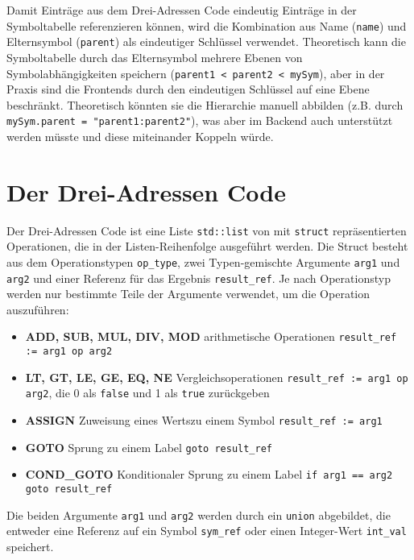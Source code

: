 Damit Einträge aus dem Drei-Adressen Code eindeutig Einträge in der Symboltabelle referenzieren können, wird die Kombination aus Name (\texttt{name}) und Elternsymbol (\texttt{parent}) als eindeutiger Schlüssel verwendet.
Theoretisch kann die Symboltabelle durch das Elternsymbol mehrere Ebenen von Symbolabhängigkeiten speichern (\texttt{parent1 < parent2 < mySym}), aber in der Praxis sind die Frontends durch den eindeutigen Schlüssel auf eine Ebene beschränkt.
Theoretisch könnten sie die Hierarchie manuell abbilden (z.B. durch \texttt{mySym.parent = "parent1:parent2"}), was aber im Backend auch unterstützt werden müsste und diese miteinander Koppeln würde.\\

\section{Der Drei-Adressen Code}

Der Drei-Adressen Code ist eine Liste \texttt{std::list} von mit \texttt{struct} repräsentierten Operationen, die in der Listen-Reihenfolge ausgeführt werden.
Die Struct besteht aus dem Operationstypen \texttt{op\_type}, zwei Typen-gemischte Argumente \texttt{arg1} und \texttt{arg2} und einer Referenz für das Ergebnis \texttt{result\_ref}.
Je nach Operationstyp werden nur bestimmte Teile der Argumente verwendet, um die Operation auszuführen:

\begin{itemize}
  \item \textbf{ADD, SUB, MUL, DIV, MOD} arithmetische Operationen \texttt{result\_ref := arg1 op arg2}
  \item \textbf{LT, GT, LE, GE, EQ, NE} Vergleichsoperationen \texttt{result\_ref := arg1 op arg2}, die 0 als \texttt{false} und 1 als \texttt{true} zurückgeben
  \item \textbf{ASSIGN} Zuweisung eines Wertszu einem Symbol \texttt{result\_ref := arg1}
  \item \textbf{GOTO} Sprung zu einem Label \texttt{goto result\_ref}
  \item \textbf{COND\_GOTO} Konditionaler Sprung zu einem Label \texttt{if arg1 == arg2 goto result\_ref}
\end{itemize}

Die beiden Argumente \texttt{arg1} und \texttt{arg2} werden durch ein \texttt{union} abgebildet, die entweder eine Referenz auf ein Symbol \texttt{sym\_ref} oder einen Integer-Wert \texttt{int\_val} speichert.
